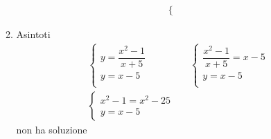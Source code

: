 \begin{exercise}
\begin{itemize}
\begin{enumerate}
\begin{align*}
\begin{cases}
		\end{cases}
		\end{align*}
		\item Asintoti
		\begin{align*}
		&\begin{cases}
	y=\dfrac{x^2-1}{x+5}\\
	y=x-5\\
	\end{cases}&&\begin{cases}
	\dfrac{x^2-1}{x+5}=x-5\\
	y=x-5\\
	\end{cases}\\
	&\begin{cases}
	x^2-1=x^2-25\\
	y=x-5
	\end{cases}
		\end{align*}
		non ha soluzione 
	\end{enumerate}
	\end{itemize}
	\begin{center}
		
	\end{center}
\end{exercise}
